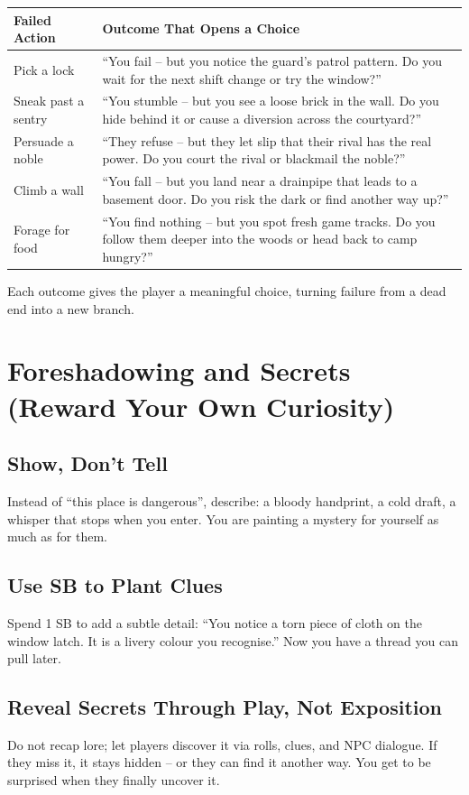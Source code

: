 \begin{center}
\begin{tabular}{ll}
\toprule
\textbf{Failed Action} & \textbf{Outcome That Opens a Choice} \\
\midrule
Pick a lock & “You fail – but you notice the guard’s patrol pattern. Do you wait for the next shift change or try the window?” \\
Sneak past a sentry & “You stumble – but you see a loose brick in the wall. Do you hide behind it or cause a diversion across the courtyard?” \\
Persuade a noble & “They refuse – but they let slip that their rival has the real power. Do you court the rival or blackmail the noble?” \\
Climb a wall & “You fall – but you land near a drainpipe that leads to a basement door. Do you risk the dark or find another way up?” \\
Forage for food & “You find nothing – but you spot fresh game tracks. Do you follow them deeper into the woods or head back to camp hungry?” \\
\bottomrule
\end{tabular}
\end{center}

Each outcome gives the player a meaningful choice, turning failure from a dead end into a new branch.

\section{Foreshadowing and Secrets (Reward Your Own Curiosity)}

\subsection*{Show, Don’t Tell}
Instead of “this place is dangerous”, describe: a bloody handprint, a cold draft, a whisper that stops when you enter. You are painting a mystery for yourself as much as for them.

\subsection*{Use SB to Plant Clues}
Spend 1 SB to add a subtle detail: “You notice a torn piece of cloth on the window latch. It is a livery colour you recognise.” Now you have a thread you can pull later.

\subsection*{Reveal Secrets Through Play, Not Exposition}
Do not recap lore; let players discover it via rolls, clues, and NPC dialogue. If they miss it, it stays hidden – or they can find it another way. You get to be surprised when they finally uncover it.

